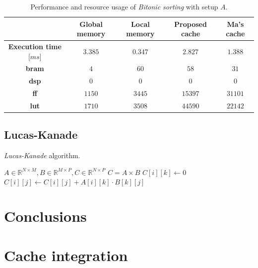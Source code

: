 \documentclass[11pt,a4paper,oneside]{memoir}
\begin{document}
\begin{table}[!htb]
	\begin{center}
		\begin{tabularx}{\textwidth}{CCCCC}
			\hline
			& \textbf{Global memory} & \textbf{Local memory} &
			\textbf{Proposed cache} & \textbf{Ma's cache} \\
			\hline
			\textbf{Execution time} [$ms$] & $3.385$ & $0.347$ &
			$2.827$ & $1.388$ \\
			\textbf{\ac{bram}} & $4$ & $60$ & $58$ & $31$ \\
			\textbf{\acs{dsp}} & $0$ & $0$ & $0$ & $0$ \\
			\textbf{\acs{ff}} & $1150$ & $3445$ & $15397$ & $31101$ \\
			\textbf{\acs{lut}} & $1710$ & $3508$ & $44590$ & $22142$ \\
			\hline
		\end{tabularx}
	\end{center}
	\caption{Performance and resource usage of \emph{Bitonic sorting}
	with setup $A$.}
	\label{tab:bitonic_report_a}
\end{table}


\section{Lucas-Kanade}
\begin{algorithm}
	\caption{\emph{Lucas-Kanade} algorithm.}\label{alg:lk}
	\begin{algorithmic}
		\Require $A \in \mathbb{R}^{N \times M},
		B \in \mathbb{R}^{M \times P}, C \in \mathbb{R}^{N \times P}$
		\Ensure $C = A \times B$
					\State $C[i][k] \gets 0$
						\State $C[i][j] \gets C[i][j] +
						A[i][k] \cdot B[k][j]$
					\EndFor
				\EndFor
			\EndFor
		\EndProcedure
	\end{algorithmic}
\end{algorithm}

\chapter{Conclusions}

\appendix
\chapter{Cache integration}

\backmatter

\printbibliography
\end{document}
